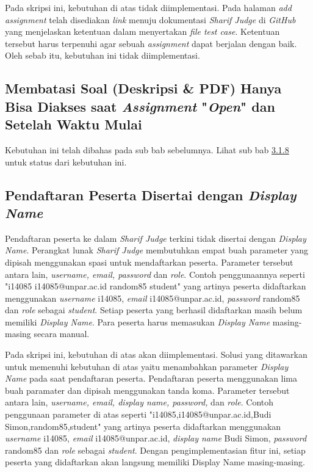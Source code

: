 Pada skripsi ini, kebutuhan di atas tidak diimplementasi. Pada halaman \textit{add assignment} telah disediakan \textit{link} menuju dokumentasi \textit{Sharif Judge} di \textit{GitHub} yang menjelaskan ketentuan dalam menyertakan \textit{file test case}. Ketentuan tersebut harus terpenuhi agar sebuah \textit{assignment} dapat berjalan dengan baik. Oleh sebab itu, kebutuhan ini tidak diimplementasi.

\subsection{Membatasi Soal (Deskripsi \& PDF) Hanya Bisa Diakses saat \textit{Assignment} "\textit{Open}" dan Setelah Waktu Mulai}
Kebutuhan ini telah dibahas pada sub bab sebelumnya. Lihat sub bab \hyperref[subsec:membatasisoal]{3.1.8} untuk status dari kebutuhan ini.

\subsection{Pendaftaran Peserta Disertai dengan \textit{Display Name}}
Pendaftaran peserta ke dalam \textit{Sharif Judge} terkini tidak disertai dengan \textit{Display Name}. Perangkat lunak \textit{Sharif Judge} membutuhkan empat buah parameter yang dipisah menggunakan spasi untuk mendaftarkan peserta. Parameter tersebut antara lain, \textit{username, \textit{email}, password} dan \textit{role}. Contoh penggunaannya seperti "i14085 i14085@unpar.ac.id random85 student" yang artinya peserta didaftarkan menggunakan \textit{username} i14085, \textit{email} i14085@unpar.ac.id, \textit{password} random85 dan \textit{role} sebagai \textit{student}. Setiap peserta yang berhasil didaftarkan masih belum memiliki \textit{Display Name}. Para peserta harus memasukan \textit{Display Name} masing-masing secara manual. 

Pada skripsi ini, kebutuhan di atas akan diimplementasi. Solusi yang ditawarkan untuk memenuhi kebutuhan di atas yaitu menambahkan parameter \textit{Display Name} pada saat pendaftaran peserta. Pendaftaran peserta menggunakan lima buah paramater dan dipisah menggunakan tanda koma. Parameter tersebut antara lain,\textit{ username, email, display name, password,} dan \textit{role}. Contoh penggunaan parameter di atas seperti "i14085,i14085@unpar.ac.id,Budi Simon,random85,student" yang artinya peserta didaftarkan menggunakan \textit{username} i14085, \textit{email} i14085@unpar.ac.id, \textit{display name} Budi Simon, \textit{password} random85 dan \textit{role} sebagai \textit{student}. Dengan pengimplementasian fitur ini, setiap peserta yang didaftarkan akan langsung memiliki Display Name masing-masing.

